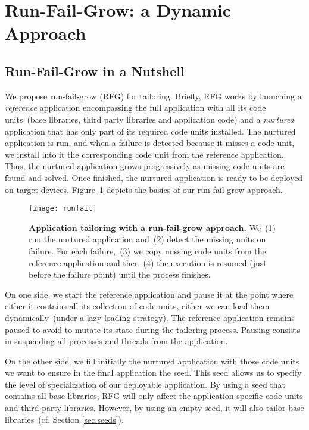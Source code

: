 \section{Run-Fail-Grow: a Dynamic Approach} \label{sec:model}

\subsection{Run-Fail-Grow in a Nutshell}

We propose run-fail-grow (RFG) for tailoring. Briefly, RFG works by launching a \emph{reference} application encompassing the full application with all its code units~(base libraries, third party libraries and application code) and a \emph{nurtured} application that has only part of its required code units installed. The nurtured application is run, and when a failure is detected because it misses a code unit, we install into it the corresponding code unit from the reference application. Thus, the nurtured application grows progressively as missing code units are found and solved.
Once finished, the nurtured application is ready to be deployed on target devices. Figure~\ref{fig:runfail} depicts the basics of our run-fail-grow approach.

\begin{figure}[ht]
\begin{center}
\texttt{[image: runfail]}
\caption{\small \textbf{Application tailoring with a run-fail-grow approach.} We~(1) run the nurtured application and~(2) detect the missing units on failure. For each failure,~(3) we copy missing code units from the reference application and then~(4) the execution is resumed (just before the failure point) until the process finishes. \label{fig:runfail}}
\end{center}
\end{figure}

On one side, we start the reference application and pause it at the point where either it contains all its collection of code units, either we can load them dynamically~(under a lazy loading strategy). The reference application remains paused to avoid to mutate its state during the tailoring process. Pausing consists in suspending all processes and threads from the application.

On the other side, we fill initially the nurtured application with those code units we want to ensure in the final application \ie the seed. This seed allows us to specify the level of specialization of our deployable application.
By using a seed that contains all base libraries, RFG will only affect the application specific code units and third-party libraries.
However, by using an empty seed, it will also tailor base libraries~(cf. Section \ref{sec:seeds}).

